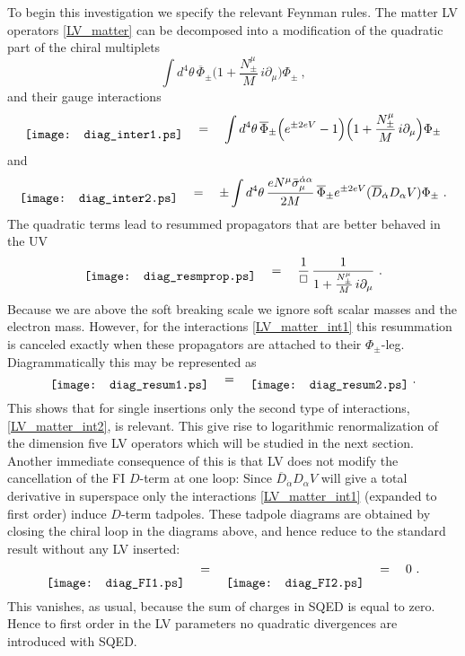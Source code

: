 \documentclass[12pt]{revtex4}
\begin{document}
To begin this investigation we specify the relevant Feynman rules. 
The matter LV operators \eqref{LV_matter} can be decomposed into
a modification of the quadratic part of the chiral multiplets 
\begin{equation} 
\int d^4\theta\, 
\overline{\Phi}_\pm 
\Big( 1 + \frac{N_\pm^\mu}{M} \, i \partial_\mu  \Big) 
\Phi_\pm~, 
\end{equation}
and their gauge interactions
\begin{equation} 
\raisebox{-1ex}{\texttt{[image: diag\_inter1.ps]}}
\quad = \quad 
\int d^4\theta\, 
\overline{\Phi}_\pm 
\Big(  e^{\pm 2 e V} - 1 \Big) 
\Big( 1 + \frac{N_\pm^\mu}{M} \, i \partial_\mu  \Big) 
\Phi_\pm
\label{LV_matter_int1}
\end{equation}
and 
\begin{equation}
\raisebox{-1ex}{\texttt{[image: diag\_inter2.ps]}}
\quad = \quad 
\pm \int d^4\theta\, 
\frac {e N^\mu \bar\sigma_\mu^{\dot\alpha\alpha}}{2M}\, 
\overline{\Phi}_\pm 
e^{\pm 2eV} 
( \overline{D}_{\dot\alpha} D_\alpha V) 
\Phi_\pm~. 
\label{LV_matter_int2}
\end{equation} 
The quadratic terms lead to resummed  propagators that are better
behaved in the UV 
\begin{equation} 
\raisebox{-1ex}{\texttt{[image: diag\_resmprop.ps]}}
\quad = \quad 
\frac 1{\Box}\,  \frac 1{1 +  \frac{ N_\pm^\mu} M \, i\partial_\mu}~. 
\end{equation} 
Because we are above the soft breaking scale we ignore soft scalar 
masses and the electron mass.
However, for the interactions \eqref{LV_matter_int1} this 
resummation is canceled exactly when these propagators are 
attached to their $\Phi_\pm$-leg. Diagrammatically this may be
represented as  
\begin{equation}
\raisebox{-1ex}{\texttt{[image: diag\_resum1.ps]}}
\quad = \quad 
\raisebox{-1ex}{\texttt{[image: diag\_resum2.ps]}}
~. 
\label{ResummedPropVer}
\end{equation}
This shows that for single insertions only the second type of
interactions, \eqref{LV_matter_int2}, is relevant. This give rise to
logarithmic renormalization of the dimension five LV operators which
will be studied in the next section. 
Another immediate consequence of this is that LV does not 
modify the cancellation of the FI $D$-term at one loop: Since
$\overline{D}_{\dot\alpha} D_\alpha V$ will give a total derivative in
superspace only the interactions \eqref{LV_matter_int1} (expanded to
first order) induce $D$-term tadpoles. These tadpole diagrams are
obtained by closing the chiral loop in the diagrams above, and hence
reduce to the standard result without any LV inserted: 
\begin{equation}
\raisebox{-2.5ex}{\texttt{[image: diag\_FI1.ps]}}
\quad = \quad 
\raisebox{-2.5ex}{\texttt{[image: diag\_FI2.ps]}}
\quad = \quad 0~. 
\end{equation}
This vanishes, as usual, because the sum of charges in SQED is equal
to zero. Hence to first order in the LV parameters no quadratic
divergences are introduced with SQED. 
\end{document}
